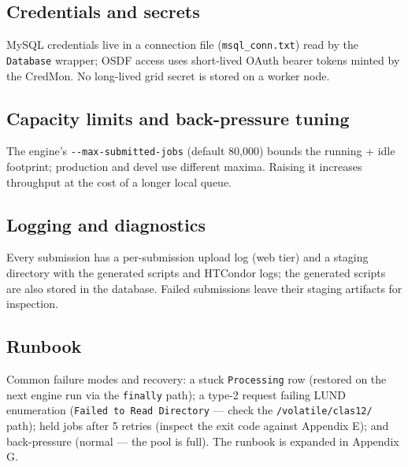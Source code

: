 \subsection{Credentials and secrets}

MySQL credentials live in a connection file (\texttt{msql\_\allowbreak{}conn.\allowbreak{}txt}) read by the
\texttt{Database} wrapper; OSDF access uses short-lived OAuth bearer tokens minted by the CredMon. No
long-lived grid secret is stored on a worker node.

\subsection{Capacity limits and back-pressure tuning}

The engine's \texttt{-\allowbreak{}-\allowbreak{}max-\allowbreak{}submitted-\allowbreak{}jobs} (default 80,000)
bounds the running + idle footprint; production and devel use different maxima. Raising it increases throughput
at the cost of a longer local queue.

\subsection{Logging and diagnostics}

Every submission has a per-submission upload log (web tier) and a staging directory with the generated scripts
and HTCondor logs; the generated scripts are also stored in the database. Failed submissions leave their
staging artifacts for inspection.

\subsection{Runbook}

Common failure modes and recovery: a stuck \texttt{Processing} row (restored on the next engine run via the
\texttt{finally} path); a type-2 request failing LUND enumeration (\texttt{Failed to Read Directory} --- check
the \texttt{/\allowbreak{}volatile/\allowbreak{}clas12/\allowbreak{}} path); held jobs after 5 retries (inspect
the exit code against Appendix E); and back-pressure (normal --- the pool is full). The runbook is expanded in
Appendix G.
